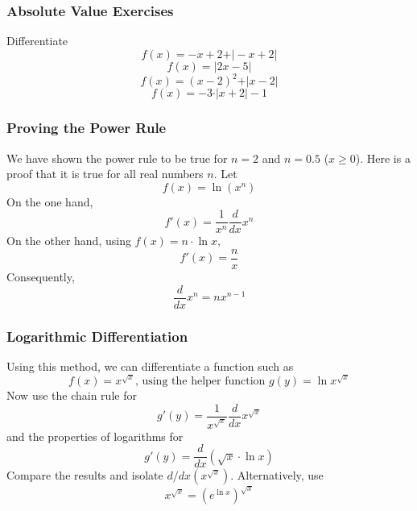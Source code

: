 \documentclass[xcolor=dvipsnames]{beamer}
\begin{document}
\begin{frame}
  \frametitle{Absolute Value Exercises}
Differentiate
\begin{equation}
  \label{eq:ikaishup}
  f(x)=-x+2+\vert{}-x+2\vert
\end{equation}
\begin{equation}
  \label{eq:emaiyito}
  f(x)=\vert{}2x-5\vert
\end{equation}
\begin{equation}
  \label{eq:deiquohr}
  f(x)=(x-2)^{2}+\vert{}x-2\vert
\end{equation}
\begin{equation}
  \label{eq:leihuwee}
  f(x)=-3\cdot\vert{}x+2\vert{}-1
\end{equation}
\end{frame}

\begin{frame}
  \frametitle{Proving the Power Rule}
  We have shown the power rule to be true for $n=2$ and $n=0.5$
  ($x\geq{}0$). Here is a proof that it is true for all real numbers
  $n$. Let
\begin{equation}
  \label{eq:taesaeph}
  f(x)=\ln\left({}x^{n}\right)
\end{equation}
On the one hand,
\begin{equation}
  \label{eq:uzahheir}
  f'(x)=\frac{1}{x^{n}}\frac{d}{dx}x^{n}
\end{equation}
On the other hand, using $f(x)=n\cdot\ln{}x$,
\begin{equation}
  \label{eq:veikoowa}
f'(x)=\frac{n}{x}  
\end{equation}
Consequently,
\begin{equation}
  \label{eq:aebiedah}
  \frac{d}{dx}x^{n}=nx^{n-1}
\end{equation}
\end{frame}

\begin{frame}
  \frametitle{Logarithmic Differentiation}
Using this method, we can differentiate a function such as
\begin{equation}
  \label{eq:ooteiquo}
  f(x)=x^{\sqrt{x}}\mbox{, using the helper function }g(y)=\ln{}x^{\sqrt{x}}
\end{equation}
Now use the chain rule for
\begin{equation}
  \label{eq:quuquish}
  g'(y)=\frac{1}{x^{\sqrt{x}}}\frac{d}{dx}x^{\sqrt{x}}
\end{equation}
and the properties of logarithms for
\begin{equation}
  \label{eq:ahfahngi}
  g'(y)=\frac{d}{dx}\left(\sqrt{x}\cdot\ln{}x\right)
\end{equation}
Compare the results and isolate $d/dx(x^{\sqrt{x}})$. Alternatively,
use
\begin{equation}
  \label{eq:gaibahto}
  x^{\sqrt{x}}=\left(e^{\ln{}x}\right)^{\sqrt{x}}
\end{equation}
\end{frame}
\end{document}
